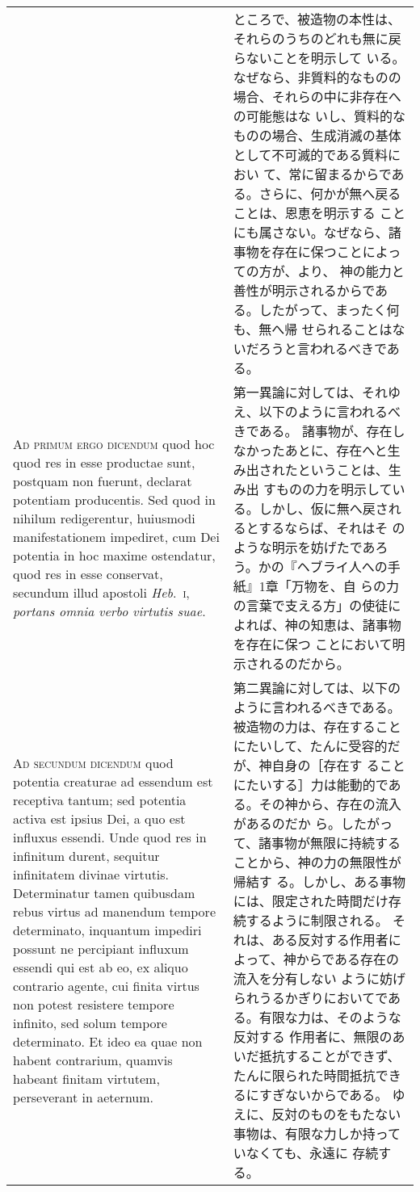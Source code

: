 \documentclass[10pt]{jsarticle} %
\begin{document}
\begin{longtable}{p{21em}p{21em}}
&

ところで、被造物の本性は、それらのうちのどれも無に戻らないことを明示して
 いる。なぜなら、非質料的なものの場合、それらの中に非存在への可能態はな
 いし、質料的なものの場合、生成消滅の基体として不可滅的である質料におい
 て、常に留まるからである。さらに、何かが無へ戻ることは、恩恵を明示する
 ことにも属さない。なぜなら、諸事物を存在に保つことによっての方が、より、
 神の能力と善性が明示されるからである。したがって、まったく何も、無へ帰
 せられることはないだろうと言われるべきである。

\\


{\scshape Ad primum ergo dicendum} quod hoc quod res in
esse productae sunt, postquam non fuerunt, declarat potentiam
producentis. Sed quod in nihilum redigerentur, huiusmodi manifestationem
impediret, cum Dei potentia in hoc maxime ostendatur, quod res in esse
conservat, secundum illud apostoli {\itshape Heb}.~{\scshape i}, {\itshape portans omnia verbo virtutis
suae}.

&

第一異論に対しては、それゆえ、以下のように言われるべきである。
諸事物が、存在しなかったあとに、存在へと生み出されたということは、生み出
 すものの力を明示している。しかし、仮に無へ戻されるとするならば、それはそ
 のような明示を妨げたであろう。かの『ヘブライ人への手紙』1章「万物を、自
 らの力の言葉で支える方」の使徒によれば、神の知恵は、諸事物を存在に保つ
 ことにおいて明示されるのだから。


\\


{\scshape Ad secundum dicendum} quod potentia creaturae
ad essendum est receptiva tantum; sed potentia activa est ipsius Dei, a
quo est influxus essendi. Unde quod res in infinitum durent, sequitur
infinitatem divinae virtutis. Determinatur tamen quibusdam rebus virtus
ad manendum tempore determinato, inquantum impediri possunt ne
percipiant influxum essendi qui est ab eo, ex aliquo contrario agente,
cui finita virtus non potest resistere tempore infinito, sed solum
tempore determinato. Et ideo ea quae non habent contrarium, quamvis
habeant finitam virtutem, perseverant in aeternum.

&

第二異論に対しては、以下のように言われるべきである。
被造物の力は、存在することにたいして、たんに受容的だが、神自身の［存在す
 ることにたいする］力は能動的である。その神から、存在の流入があるのだか
 ら。したがって、諸事物が無限に持続することから、神の力の無限性が帰結す
 る。しかし、ある事物には、限定された時間だけ存続するように制限される。
 それは、ある反対する作用者によって、神からである存在の流入を分有しない
 ように妨げられうるかぎりにおいてである。有限な力は、そのような反対する
 作用者に、無限のあいだ抵抗することができず、たんに限られた時間抵抗でき
 るにすぎないからである。
ゆえに、反対のものをもたない事物は、有限な力しか持っていなくても、永遠に
 存続する。


\end{longtable}
\end{document}
